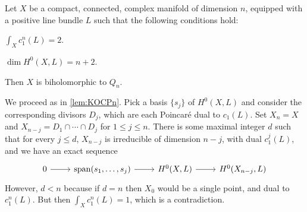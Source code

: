 \begin{thm}\label{thm:KOQn}
	Let $X$ be a compact, connected, complex manifold of dimension $n$, equipped with a positive line bundle $L$ such that the following conditions hold:
	\begin{numberedlist}
		\item $\displaystyle\int_X c_1^n(L)=2$.
		\item $\dim H^0(X,L)=n+2$.
	\end{numberedlist}
	Then $X$ is biholomorphic to $Q_n$.
\end{thm}
\begin{myproof}
	We proceed as in \cref{lem:KOCPn}. Pick a basis $\{s_j\}$ of $H^0(X,L)$ and consider the corresponding divisors $D_j$, which are each Poincar\'e dual to $c_1(L)$. Set $X_n=X$ and $X_{n-j}=D_1\cap \cdots \cap D_j$ for $1\leq j \leq n$. There is some maximal integer $d$ such that for every $j\leq d$, $X_{n-j}$ is irreducible of dimension $n-j$, with dual $c_1^j(L)$, and we have an exact sequence
	\begin{equation*}
		\begin{tikzcd}
			0 \ar[r] & \Span(s_1,\dots,s_j)\ar[r] & H^0(X,L) \ar[r] & H^0(X_{n-j},L)
		\end{tikzcd}
	\end{equation*}
	However, $d<n$ because if $d=n$ then $X_0$ would be a single point, and dual to $c_1^n(L)$. But then $\int_X c_1^n(L)=1$, which is a contradiction.


\end{myproof}
